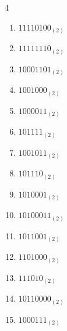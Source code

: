 \begin{multicols}{4}
\begin{enumerate}
        \phantom{$=7$}

  \item $11110100_{(2)}$

        \phantom{$=244$}

\columnbreak %

\resetques

  \item $11111110_{(2)}$

        \phantom{$=254$}

  \item $10001101_{(2)}$

        \phantom{$=141$}

  \item $1001000_{(2)}$

        \phantom{$=72$}

  \item $1000011_{(2)}$

        \phantom{$=67$}

  \item $101111_{(2)}$

        \phantom{$=47$}

  \item $1001011_{(2)}$

        \phantom{$=75$}

  \item $101110_{(2)}$

        \phantom{$=46$}

  \item $1010001_{(2)}$

        \phantom{$=81$}

  \item $10100011_{(2)}$

        \phantom{$=163$}

  \item $1011001_{(2)}$

        \phantom{$=89$}

  \item $1101000_{(2)}$

        \phantom{$=104$}

  \item $111010_{(2)}$

        \phantom{$=58$}

  \item $10110000_{(2)}$

        \phantom{$=176$}

  \item $1000111_{(2)}$


\end{enumerate}
\end{multicols}
